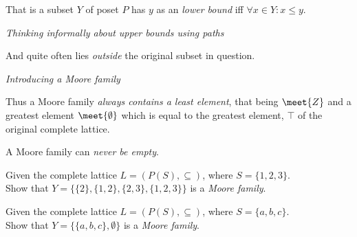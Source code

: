 That is a subset $Y$ of poset $P$ has $y$ as an \textit{lower bound} iff $\forall x \in Y : x \leqslant y$. 

\frmrule 

\textit{Thinking informally about upper bounds using paths}





And quite often lies \textit{outside} the original subset in question. 







\frmrule 

\textit{Introducing a Moore family}




Thus a Moore family \textit{always contains a least element}, that being $\meet{Z}$ 
and a greatest element $\meet{\emptyset}$ which is equal to the 
greatest element, $\top$ of the original complete lattice. 

A Moore family can \textit{never be empty}. 

\frmrule 

\begin{example}
Given the complete lattice $L = (P(S), \subseteq)$, where $S = \{1,2,3\}$. \\
Show that $Y = \{ \{2\}, \{1,2\}, \{2,3\}, \{1,2,3\} \}$ is a \textit{Moore family}.
\end{example}

\frmrule 

\begin{example}
Given the complete lattice $L = (P(S), \subseteq)$, where $S = \{a,b,c\}$. \\
Show that $Y = \{ \{a,b,c\}, \emptyset \}$ is a \textit{Moore family}.\\
\end{example}

